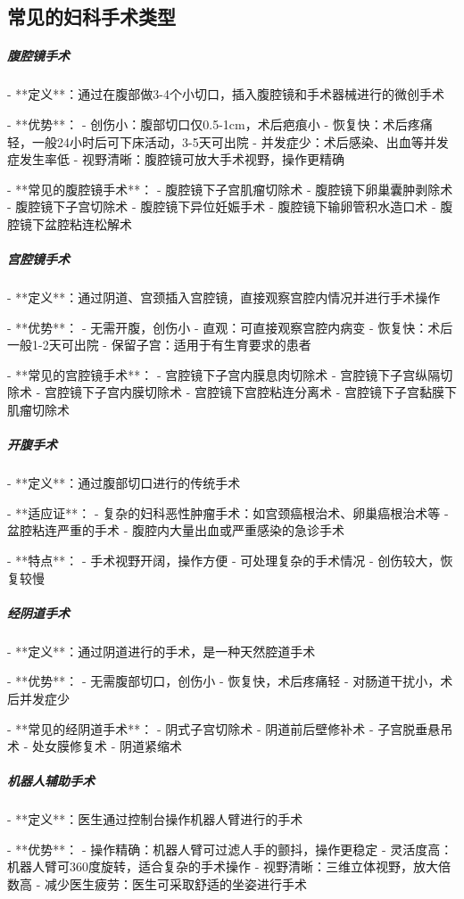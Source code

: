 \begin{enumerate}
\subsection{常见的妇科手术类型}

\subparagraph{腹腔镜手术}

- **定义**：通过在腹部做3-4个小切口，插入腹腔镜和手术器械进行的微创手术

- **优势**：
  - 创伤小：腹部切口仅0.5-1cm，术后疤痕小
  - 恢复快：术后疼痛轻，一般24小时后可下床活动，3-5天可出院
  - 并发症少：术后感染、出血等并发症发生率低
  - 视野清晰：腹腔镜可放大手术视野，操作更精确

- **常见的腹腔镜手术**：
  - 腹腔镜下子宫肌瘤切除术
  - 腹腔镜下卵巢囊肿剥除术
  - 腹腔镜下子宫切除术
  - 腹腔镜下异位妊娠手术
  - 腹腔镜下输卵管积水造口术
  - 腹腔镜下盆腔粘连松解术

\subparagraph{宫腔镜手术}

- **定义**：通过阴道、宫颈插入宫腔镜，直接观察宫腔内情况并进行手术操作

- **优势**：
  - 无需开腹，创伤小
  - 直观：可直接观察宫腔内病变
  - 恢复快：术后一般1-2天可出院
  - 保留子宫：适用于有生育要求的患者

- **常见的宫腔镜手术**：
  - 宫腔镜下子宫内膜息肉切除术
  - 宫腔镜下子宫纵隔切除术
  - 宫腔镜下子宫内膜切除术
  - 宫腔镜下宫腔粘连分离术
  - 宫腔镜下子宫黏膜下肌瘤切除术

\subparagraph{开腹手术}

- **定义**：通过腹部切口进行的传统手术

- **适应证**：
  - 复杂的妇科恶性肿瘤手术：如宫颈癌根治术、卵巢癌根治术等
  - 盆腔粘连严重的手术
  - 腹腔内大量出血或严重感染的急诊手术

- **特点**：
  - 手术视野开阔，操作方便
  - 可处理复杂的手术情况
  - 创伤较大，恢复较慢

\subparagraph{经阴道手术}

- **定义**：通过阴道进行的手术，是一种天然腔道手术

- **优势**：
  - 无需腹部切口，创伤小
  - 恢复快，术后疼痛轻
  - 对肠道干扰小，术后并发症少

- **常见的经阴道手术**：
  - 阴式子宫切除术
  - 阴道前后壁修补术
  - 子宫脱垂悬吊术
  - 处女膜修复术
  - 阴道紧缩术

\subparagraph{机器人辅助手术}

- **定义**：医生通过控制台操作机器人臂进行的手术

- **优势**：
  - 操作精确：机器人臂可过滤人手的颤抖，操作更稳定
  - 灵活度高：机器人臂可360度旋转，适合复杂的手术操作
  - 视野清晰：三维立体视野，放大倍数高
  - 减少医生疲劳：医生可采取舒适的坐姿进行手术


\end{enumerate}

